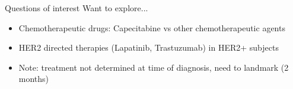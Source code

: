 \begin{frame}{Questions of interest}
Want to explore...
\begin{itemize}
 \item Chemotherapeutic drugs: Capecitabine vs other chemotherapeutic agents
 \item HER2 directed therapies (Lapatinib, Trastuzumab) in HER2+ subjects
 \item Note: treatment not determined at time of diagnosis, need to landmark (2 months)
 
\end{itemize}

 
\end{frame}


